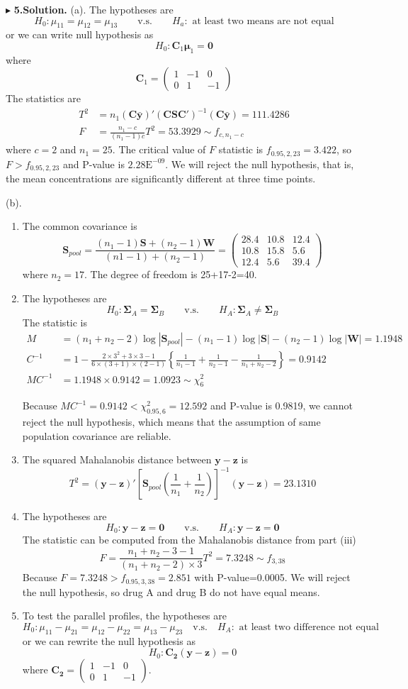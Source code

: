 \documentclass[letterpaper, 12pt]{article}
\newcommand{\ba}{$$\begin{aligned}}
\newcommand{\ea}{\end{aligned}$$}
\newcommand{\lma}{\left(\begin{matrix}}
\newcommand{\rma}{\end{matrix}\right)}
\begin{document}
$\blacktriangleright$ \textbf{5.\quad Solution.}
(a). The hypotheses are
$$
H_0:\mu_{11}=\mu_{12}=\mu_{13}\qquad\text{v.s.}\qquad H_a: \text{ at least two means are not equal}
$$
or we can write null hypothesis as
$$
H_0: \bm{C}_1\bm{\mu}_1=\bm{0}
$$
where
$$
\bm{C}_1=\lma 1 &-1 &0\\ 0 &1 &-1\rma
$$
The statistics are
\ba
T^2&=n_1(\bm{C\bar{y}})'(\bm{CSC}')^{-1}(\bm{C\bar{y}})=111.4286\\
F&=\frac{n_1-c}{(n_1-1)c}T^2=53.3929\sim f_{c,n_1-c}
\ea
where $c=2$ and $n_1=25$. The critical value of $F$ statistic is $f_{0.95,2,23}=3.422$, so $F>f_{0.95,2,23}$ and P-value is $2.28\text{E}^{-09}$. We will reject the  null hypothesis, that is, the mean concentrations are significantly different at three time points.


(b). \begin{enumerate}[i]
\item The common covariance is
$$
\bm{S}_{pool}=\frac{(n_1-1)\bm{S}+(n_2-1)\bm{W}}{(n1-1)+(n_2-1)}=\lma 28.4 &10.8 & 12.4\\10.8 &15.8 &5.6\\12.4 & 5.6 &39.4\rma
$$
where $n_2=17$. The degree of freedom is 25+17-2=40.
\item The hypotheses are 
$$
H_0:\bm{\Sigma}_A=\bm{\Sigma}_B\qquad\text{v.s.}\qquad H_A:\bm{\Sigma}_A\not=\bm{\Sigma}_B
$$
The statistic is
\ba
M&=(n_1+n_2-2)\log|\bm{S}_{pool}|-(n_1-1)\log|\bm{S}|-(n_2-1)\log|\bm{W}|=1.1948\\
C^{-1}&=1-\frac{2\times3^2+3\times3-1}{6\times(3+1)\times(2-1)}\left\{\frac{1}{n_1-1}+\frac{1}{n_2-1}-\frac{1}{n_1+n_2-2}\right\}=0.9142\\
MC^{-1}&=1.1948\times0.9142=1.0923\sim\chi^2_{6}
\ea

Because $MC^{-1}=0.9142<\chi^2_{0.95,6}=12.592$ and P-value is 0.9819, we cannot reject the null hypothesis, which means that the assumption of same population covariance are reliable.

\item The squared Mahalanobis distance between $\bm{y}-\bm{z}$ is
$$
T^2=(\bm{y}-\bm{z})'\left[\bm{S}_{pool}\left(\frac{1}{n_1}+\frac{1}{n_2}\right)\right]^{-1}(\bm{y}-\bm{z})=23.1310
$$


\item The hypotheses are
$$
H_0:\bm{y}-\bm{z}=\bm{0}\qquad\text{v.s.}\qquad H_A:\bm{y}-\bm{z}=\bm{0}
$$
The statistic can be computed from the Mahalanobis distance from part (iii)
$$
F=\frac{n_1+n_2-3-1}{(n_1+n_2-2)\times3}T^2=7.3248\sim f_{3,38}
$$
Because $F=7.3248>f_{0.95,3,38}=2.851$ with P-value=0.0005. We will reject the null hypothesis, so drug A and drug B do not have equal means.
\item To test the parallel profiles, the hypotheses are
$$
H_0:\mu_{11}-\mu_{21}=\mu_{12}-\mu_{22}=\mu_{13}-\mu_{23}\quad\text{v.s.}\quad H_A: \text{ at least two difference not equal}
$$
or we can rewrite the null hypothesis as
$$
H_0:\bm{C_2}(\bm{y}-\bm{z})=0
$$
where $\bm{C_2}=\lma 1 &-1 &0\\ 0 &1 &-1\rma$. 


\end{enumerate}
\end{document}
